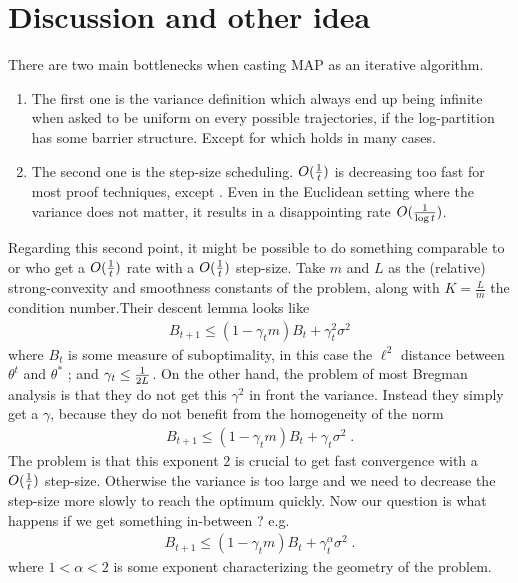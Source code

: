 \documentclass{article}
\newcommand{\nat}{\theta}
\newcommand{\lr}{\gamma} %
\begin{document}
\section{Discussion and other idea}
There are two main bottlenecks when casting MAP as an iterative algorithm. 
\begin{enumerate}
	\item The first one is the variance definition which always end up being infinite when asked to be uniform on every possible trajectories, if the log-partition  has some barrier structure. Except for \citet{dorazio2021stochastic} which holds in many cases.
	\item The second one is the step-size scheduling. $O(\frac{1}{t})$ is decreasing too fast for most proof techniques, except \citet{dragomir2021fast}. Even in the Euclidean setting where the variance does not matter, it results in a disappointing rate $O(\frac{1}{\log t})$.
\end{enumerate}
Regarding this second point, it might be possible to do something comparable to \citet{gower2019sgd} or \citet{dragomir2021fast} who get a $O(\frac{1}{t})$ rate with a $O(\frac{1}{t})$ step-size. Take $m$ and $L$ as the (relative) strong-convexity and smoothness constants of the problem, along with $K=\frac{L}{m}$ the condition number.Their descent lemma looks like
\begin{align}
	B_{t+1} \leq ( 1 - \lr_t m) B_t + \lr_t^2 \sigma^2
\end{align}
where $B_t$ is some measure of suboptimality, in this case the $\ell^2$ distance between $\nat^t$ and $\nat^*$ ; and $\lr_t \leq \inv{2L}$.
On the other hand, the problem of most Bregman analysis \citep{hanzely2018fastest,dorazio2021stochastic} is that they do not get this $\lr^2$ in front the variance. Instead they simply get a $\lr$, because they do not benefit from the homogeneity of the norm
\begin{align}
	B_{t+1} \leq ( 1 - \lr_t m) B_t + \lr_t \sigma^2 \; .
\end{align}
The problem is that this exponent $2$ is crucial to get fast convergence with a $O(\frac{1}{t})$ step-size. Otherwise the variance is too large and we need to decrease the step-size more slowly to reach the optimum quickly.
Now our question is what happens if we get something in-between ? e.g.
\begin{align}
	B_{t+1} \leq ( 1 - \lr_t m) B_t + \lr_t^\alpha \sigma^2 \; .
\end{align}
where $1<\alpha<2$ is some exponent characterizing the geometry of the problem.
\end{document}
